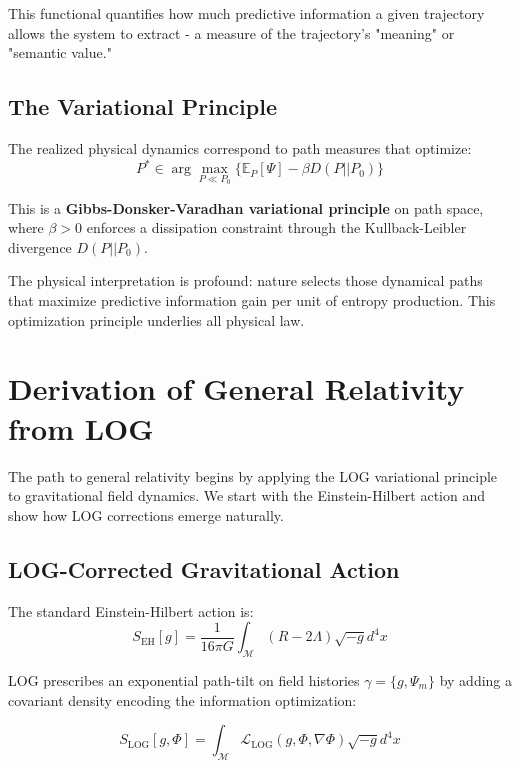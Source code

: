 \documentclass[12pt]{article}
\begin{document}
This functional quantifies how much predictive information a given trajectory allows the system to extract - a measure of the trajectory's "meaning" or "semantic value."

\subsection{The Variational Principle}

The realized physical dynamics correspond to path measures that optimize:
\begin{equation}
P^* \in \arg\max_{P \ll P_0} \{\mathbb{E}_P[\Psi] - \beta D(P||P_0)\} \tag{1.7}
\end{equation}

This is a \textbf{Gibbs-Donsker-Varadhan variational principle} on path space, where $\beta > 0$ enforces a dissipation constraint through the Kullback-Leibler divergence $D(P||P_0)$.

The physical interpretation is profound: nature selects those dynamical paths that maximize predictive information gain per unit of entropy production. This optimization principle underlies all physical law.

\section{Derivation of General Relativity from LOG}

The path to general relativity begins by applying the LOG variational principle to gravitational field dynamics. We start with the Einstein-Hilbert action and show how LOG corrections emerge naturally.

\subsection{LOG-Corrected Gravitational Action}

The standard Einstein-Hilbert action is:
\begin{equation}
S_{\mathrm{EH}}[g] = \frac{1}{16\pi G}\int_\mathcal{M} (R - 2\Lambda)\sqrt{-g}d^4x \tag{2.1}
\end{equation}

LOG prescribes an exponential path-tilt on field histories $\gamma = \{g, \Psi_m\}$ by adding a covariant density encoding the information optimization:

\begin{equation}
S_{\mathrm{LOG}}[g,\Phi] = \int_\mathcal{M} \mathcal{L}_{\mathrm{LOG}}(g,\Phi,\nabla\Phi)\sqrt{-g}d^4x \tag{2.2}
\end{equation}
\end{document}
